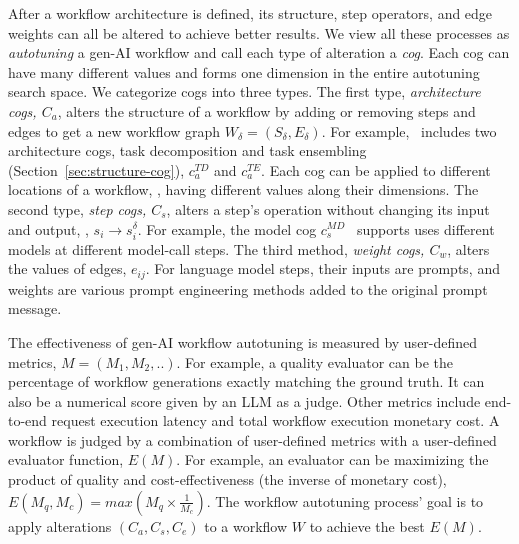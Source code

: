 After a workflow architecture is defined, its structure, step operators, and edge weights can all be altered to achieve better results. We view all these processes as {\em autotuning} a gen-AI workflow and call each type of alteration a {\em cog}. Each cog can have many different values and forms one dimension in the entire autotuning search space. We categorize cogs into three types.
The first type, {\em architecture cogs, $C_a$}, alters the structure of a workflow by adding or removing steps and edges to get a new workflow graph $W_\delta = (S_\delta,E_\delta)$. For example, \sysname\ includes two architecture cogs, task decomposition and task ensembling (Section~\ref{sec:structure-cog}), $c_a^{TD}$ and $c_a^{TE}$. Each cog can be applied to different locations of a workflow, \ie, having different values along their dimensions. %
The second type, {\em step cogs, $C_s$}, alters a step's operation without changing its input and output, \ie, $s_i\rightarrow s_i^{\delta}$. For example, the model cog $c_s^{MD}$ \sysname\ supports uses different models at different model-call steps.
The third method, {\em weight cogs, $C_w$}, alters the values of edges, $e_{ij}$.
For language model steps, their inputs are prompts, and weights are various prompt engineering methods added to the original prompt message.

The effectiveness of gen-AI workflow autotuning is measured by user-defined metrics, $M=(M_1, M_2,..)$. For example, a quality evaluator can be the percentage of workflow generations exactly matching the ground truth. It can also be a numerical score given by an LLM as a judge. Other metrics include end-to-end request execution latency and total workflow execution monetary cost. A workflow is judged by a combination of user-defined metrics with a user-defined evaluator function, $E(M)$. For example, an evaluator can be maximizing the product of quality and cost-effectiveness (the inverse of monetary cost), $E(M_q,M_c)=max(M_q\times \frac{1}{M_c})$. The workflow autotuning process' goal is to apply alterations $(C_a,C_s,C_e)$ to a workflow $W$ to achieve the best $E(M)$.

